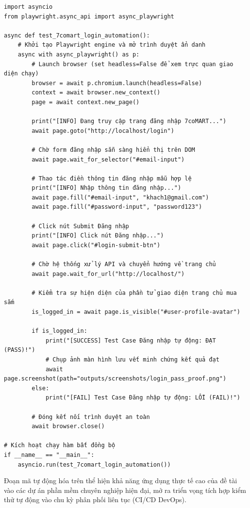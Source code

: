 \begin{verbatim}
import asyncio
from playwright.async_api import async_playwright

async def test_7comart_login_automation():
    # Khởi tạo Playwright engine và mở trình duyệt ẩn danh
    async with async_playwright() as p:
        # Launch browser (set headless=False để xem trực quan giao diện chạy)
        browser = await p.chromium.launch(headless=False)
        context = await browser.new_context()
        page = await context.new_page()
        
        print("[INFO] Đang truy cập trang đăng nhập 7coMART...")
        await page.goto("http://localhost/login")
        
        # Chờ form đăng nhập sẵn sàng hiển thị trên DOM
        await page.wait_for_selector("#email-input")
        
        # Thao tác điền thông tin đăng nhập mẫu hợp lệ
        print("[INFO] Nhập thông tin đăng nhập...")
        await page.fill("#email-input", "khach1@gmail.com")
        await page.fill("#password-input", "password123")
        
        # Click nút Submit Đăng nhập
        print("[INFO] Click nút Đăng nhập...")
        await page.click("#login-submit-btn")
        
        # Chờ hệ thống xử lý API và chuyển hướng về trang chủ
        await page.wait_for_url("http://localhost/")
        
        # Kiểm tra sự hiện diện của phần tử giao diện trang chủ mua sắm
        is_logged_in = await page.is_visible("#user-profile-avatar")
        
        if is_logged_in:
            print("[SUCCESS] Test Case Đăng nhập tự động: ĐẠT (PASS)!")
            # Chụp ảnh màn hình lưu vết minh chứng kết quả đạt
            await page.screenshot(path="outputs/screenshots/login_pass_proof.png")
        else:
            print("[FAIL] Test Case Đăng nhập tự động: LỖI (FAIL)!")
            
        # Đóng kết nối trình duyệt an toàn
        await browser.close()

# Kích hoạt chạy hàm bất đồng bộ
if __name__ == "__main__":
    asyncio.run(test_7comart_login_automation())
\end{verbatim}

Đoạn mã tự động hóa trên thể hiện khả năng ứng dụng thực tế cao của đề tài vào các dự án phần mềm chuyên nghiệp hiện đại, mở ra triển vọng tích hợp kiểm thử tự động vào chu kỳ phân phối liên tục (CI/CD DevOps).
